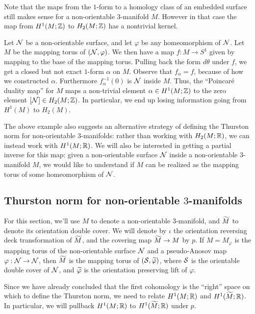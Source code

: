 Note that the maps from the $1$-form to a homology class of an embedded surface still makes sense for a non-orientable $3$-manifold $M$. However in that case the map from $H^1(M; \mathbb{Z})$ to $H_2(M; \mathbb{Z})$ has a nontrivial kernel.

  Let $\mathcal{N}$ be a non-orientable surface, and let $\varphi$ be any homeomorphism of $\mathcal{N}$. Let $M$ be the mapping torus
  of $(\mathcal{N}, \varphi)$. We then have a map $f: M \to S^1$ given by mapping to the base of the mapping torus.
  Pulling back the form $d\theta$ under $f$, we get a closed but not exact $1$-form $\alpha$ on $M$. Observe
  that $f_{\alpha} = f$, because of how we constructed $\alpha$. Furthermore $f_{\alpha}^{-1}(0)$ is $\mathcal{N}$ inside
  $M$. Thus, the ``Poincar\'e duality map'' for $M$ maps a non-trivial element $\alpha \in H^1(M; \mathbb{Z})$ to the
  zero element $[\mathcal{N}] \in H_2(M; \mathbb{Z})$. In particular, we end up losing information
  going from $H^1(M)$ to $H_2(M)$.


The above example also suggests an alternative strategy of defining the Thurston norm for non-orientable
$3$-manifolds: rather than working with $H_2(M; \mathbb{R})$, we can instead work with $H^1(M; \mathbb{R})$. We will also be interested in getting a partial
inverse for this map: given a non-orientable surface $\mathcal{N}$ inside a non-orientable
$3$-manifold $M$, we would like to understand if $M$ can be realized as the mapping torus of some homeomorphism of
$\mathcal{N}$.

\subsection{Thurston norm for non-orientable $3$-manifolds}
\label{sec:thurston-norm-non}

For this section, we'll use $M$ to denote a non-orientable $3$-manifold, and $\widetilde{M}$ to denote its
orientation double cover. We will denote by $\iota$ the orientation reversing deck transformation
of $\widetilde{M}$, and the covering map $\widetilde{M} \to M$ by $p$. If $M=M_\varphi$ is the mapping torus of the
non-orientable surface $\mathcal{N}$ and a pseudo-Anosov map $\varphi: \mathcal{N} \to \mathcal{N}$, then $\widetilde{M}$ is the
mapping torus of $(\mathcal{S}, \widetilde{\varphi})$, where $\mathcal{S}$ is the orientable double cover of $\mathcal{N}$, and
$\widetilde{\varphi}$ is the orientation preserving lift of $\varphi$.

Since we have already concluded that the first cohomology is the ``right'' space on which to define the
Thurston norm, we need to relate $H^1(M; \mathbb{R})$ and $H^1(\widetilde{M}; \mathbb{R})$.  In particular, we will pullback $H^1(M;\mathbb{R})$ to $H^1(\widetilde{M};\mathbb{R})$ under $p$.

